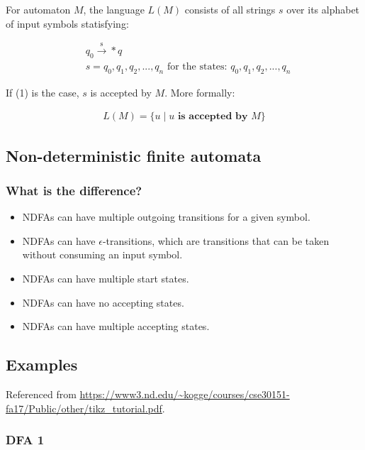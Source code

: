 \documentclass{article}
\begin{document}
For automaton $M$, the language $L(M)$ consists of all strings $s$ over its alphabet of input symbols statisfying:

\begin{align}
    & q_0 \xrightarrow{\text{s}} * q \\
    & s = q_0,q_1,q_2,...,q_n \text{ for the states: } q_0, q_1, q_2, ..., q_n
\end{align}

If (1) is the case, $s$ is accepted by $M$.
More formally:

\begin{align*}
    L(M) = \{u \mid u \textbf{ is accepted by } M\}
\end{align*}

\subsection{Non-deterministic finite automata}

\subsubsection{What is the difference?}

\begin{itemize}
    \item NDFAs can have multiple outgoing transitions for a given symbol.
    \item NDFAs can have $\epsilon$-transitions, which are transitions that can be taken without consuming an input symbol.
    \item NDFAs can have multiple start states.
    \item NDFAs can have no accepting states.
    \item NDFAs can have multiple accepting states.
\end{itemize}
\subsection{Examples}

Referenced from \url{https://www3.nd.edu/~kogge/courses/cse30151-fa17/Public/other/tikz_tutorial.pdf}.

\subsubsection{DFA 1}

\end{document}
